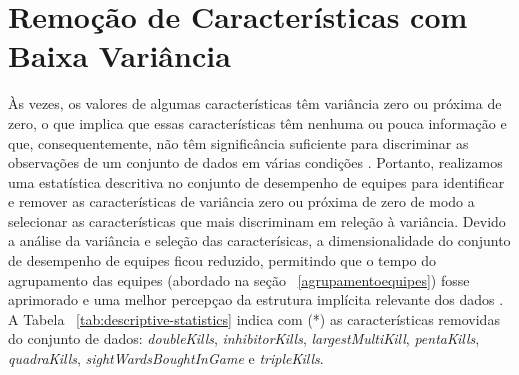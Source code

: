 \section{Remoção de Características com Baixa Variância}
Às vezes, os valores de algumas características têm variância zero ou próxima de zero, o que implica que essas características têm nenhuma ou pouca informação e que, consequentemente, não têm significância suficiente para discriminar as observações de um conjunto de dados em várias condições \cite{qing2014feature}. Portanto, realizamos uma estatística descritiva no conjunto de desempenho de equipes para identificar e remover as características de variância zero ou próxima de zero de modo a selecionar as características que mais discriminam em releção à variância. Devido a análise da variância e seleção das caracterísicas, a dimensionalidade do conjunto de desempenho de equipes ficou reduzido, permitindo que o tempo do agrupamento das equipes (abordado na seção ~\ref{agrupamentoequipes}) fosse aprimorado e uma melhor percepçao da estrutura implícita relevante dos dados \cite{boutsidis2009unsupervised}. A Tabela ~\ref{tab:descriptive-statistics} indica com (*) as características removidas do conjunto de dados: \textit{doubleKills}, \textit{inhibitorKills}, \textit {largestMultiKill}, \textit{pentaKills}, \textit {quadraKills}, \textit {sightWardsBoughtInGame} e \textit{tripleKills}.


